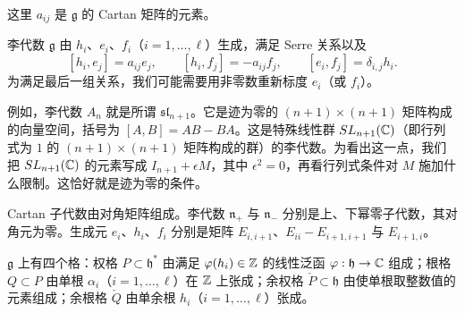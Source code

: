 

这里 $a_{ij}$ 是 $\mathfrak g$ 的 Cartan 矩阵的元素。

李代数 $\mathfrak g$ 由 $h_i$、$e_i$、$f_i$（$i=1,\dots,\ell$）生成，满足 Serre 关系以及
\[
    [h_i,e_j]=a_{ij}e_j,\qquad [h_i,f_j]=-a_{ij}f_j,\qquad [e_i,f_j]=\delta_{i,j}h_i.
\]
为满足最后一组关系，我们可能需要用非零数重新标度 $e_i$（或 $f_i$）。


例如，李代数 $A_n$ 就是所谓 $\mathfrak{sl}_{n+1}$。它是迹为零的 $(n+1)\times(n+1)$ 矩阵构成的向量空间，括号为 $[A,B]=AB-BA$。这是特殊线性群 $SL_{n+1}(\mathbb{C})$（即行列式为 $1$ 的 $(n+1)\times(n+1)$ 矩阵构成的群）的李代数。为看出这一点，我们把 $SL_{n+1}(\mathbb{C})$ 的元素写成 $I_{n+1}+\epsilon M$，其中 $\epsilon^2=0$，再看行列式条件对 $M$ 施加什么限制。这恰好就是迹为零的条件。

Cartan 子代数由对角矩阵组成。李代数 $\mathfrak n_+$ 与 $\mathfrak n_-$ 分别是上、下幂零子代数，其对角元为零。生成元 $e_i$、$h_i$、$f_i$ 分别是矩阵 $E_{i,i+1}$、$E_{ii}-E_{i+1,i+1}$ 与 $E_{i+1,i}$。

$\mathfrak g$ 上有四个格：权格 $P\subset\mathfrak h^*$ 由满足 $\varphi(h_i)\in\mathbb{Z}$ 的线性泛函 $\varphi:\mathfrak h\to\mathbb{C}$ 组成；根格 $Q\subset P$ 由单根 $\alpha_i$（$i=1,\dots,\ell$）在 $\mathbb{Z}$ 上张成；余权格 $\check P\subset\mathfrak h$ 由使单根取整数值的元素组成；余根格 $\check Q$ 由单余根 $h_i$（$i=1,\dots,\ell$）张成。

